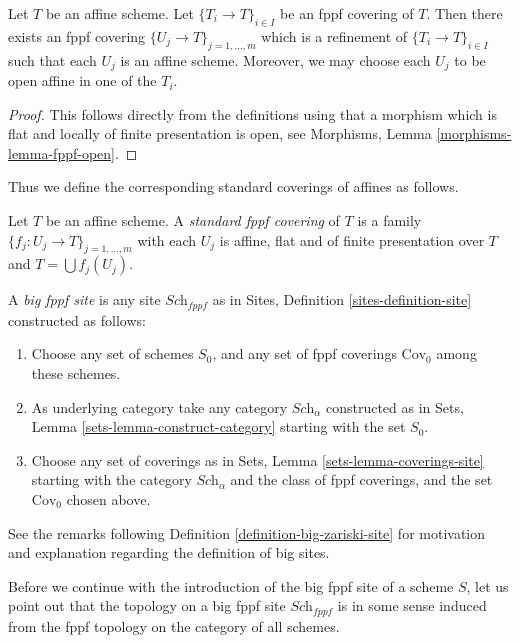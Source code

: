 \begin{lemma}
\label{lemma-fppf-affine}
Let $T$ be an affine scheme.
Let $\{T_i \to T\}_{i \in I}$ be an fppf covering of $T$.
Then there exists an fppf covering
$\{U_j \to T\}_{j = 1, \ldots, m}$ which is a refinement
of $\{T_i \to T\}_{i \in I}$ such that each $U_j$ is an affine
scheme. Moreover, we may choose each $U_j$ to be open affine
in one of the $T_i$.
\end{lemma}

\begin{proof}
This follows directly from the definitions using that a
morphism which is flat and locally of finite presentation is open,
see Morphisms, Lemma \ref{morphisms-lemma-fppf-open}.
\end{proof}

\noindent
Thus we define the corresponding standard coverings of affines as follows.

\begin{definition}
\label{definition-standard-fppf}
Let $T$ be an affine scheme. A {\it standard fppf covering}
of $T$ is a family $\{f_j : U_j \to T\}_{j = 1, \ldots, m}$
with each $U_j$ is affine, flat and of finite presentation over $T$
and $T = \bigcup f_j(U_j)$.
\end{definition}

\begin{definition}
\label{definition-big-fppf-site}
A {\it big fppf site} is any site $\textit{Sch}_{fppf}$ as in
Sites, Definition \ref{sites-definition-site} constructed as follows:
\begin{enumerate}
\item Choose any set of schemes $S_0$, and any set of fppf coverings
$\text{Cov}_0$ among these schemes.
\item As underlying category take any category $\textit{Sch}_\alpha$
constructed as in Sets, Lemma \ref{sets-lemma-construct-category}
starting with the set $S_0$.
\item Choose any set of coverings as in
Sets, Lemma \ref{sets-lemma-coverings-site} starting with the
category $\textit{Sch}_\alpha$ and the class of fppf coverings,
and the set $\text{Cov}_0$ chosen above.
\end{enumerate}
\end{definition}

\noindent
See the remarks following Definition \ref{definition-big-zariski-site}
for motivation and explanation regarding the definition of big sites.

\medskip\noindent
Before we continue with the introduction of the big fppf site of
a scheme $S$, let us point out that the topology on a big fppf site
$\textit{Sch}_{fppf}$ is in some sense induced from the fppf topology
on the category of all schemes.

